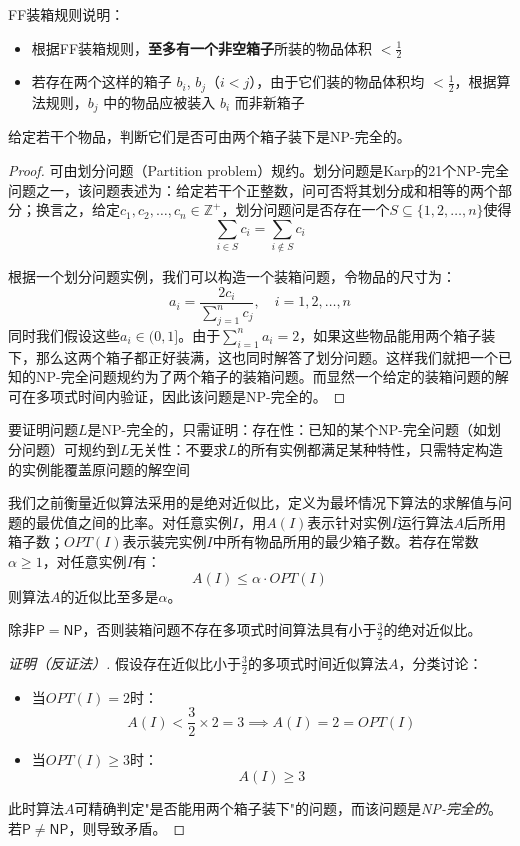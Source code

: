 \documentclass[./../main.tex]{subfiles} %
\begin{document}
FF装箱规则说明：
\begin{itemize}
    \item 根据FF装箱规则，\textbf{至多有一个非空箱子}所装的物品体积 $< \frac{1}{2}$
    \item 若存在两个这样的箱子 $b_i$, $b_j$（$i < j$），由于它们装的物品体积均 $< \frac{1}{2}$，根据算法规则，$b_j$ 中的物品应被装入 $b_i$ 而非新箱子
\end{itemize}

\begin{theorem}
    给定若干个物品，判断它们是否可由两个箱子装下是NP-完全的。
\end{theorem}

\begin{proof}
    可由划分问题（Partition problem）规约。划分问题是Karp的21个NP-完全问题之一，该问题表述为：给定若干个正整数，问可否将其划分成和相等的两个部分；换言之，给定$c_1, c_2, \ldots, c_n \in \mathbb{Z}^+$，划分问题问是否存在一个$S \subseteq \{1,2,\ldots,n\}$使得
    $$
    \sum_{i \in S} c_i = \sum_{i \notin S} c_i
    $$

    根据一个划分问题实例，我们可以构造一个装箱问题，令物品的尺寸为：
    $$
    a_i = \frac{2c_i}{\sum_{j=1}^{n} c_j}, \quad i=1,2,\ldots,n
    $$
    同时我们假设这些$a_i \in (0,1]$。由于$\sum_{i=1}^{n} a_i = 2$，如果这些物品能用两个箱子装下，那么这两个箱子都正好装满，这也同时解答了划分问题。这样我们就把一个已知的NP-完全问题规约为了两个箱子的装箱问题。而显然一个给定的装箱问题的解可在多项式时间内验证，因此该问题是NP-完全的。
\end{proof}


要证明问题$L$是NP-完全的，只需证明：
​存在性​：已知的某个NP-完全问题（如划分问题）可规约到$L$
​无关性​：不要求$L$的所有实例都满足某种特性，只需特定构造的实例能覆盖原问题的解空间

我们之前衡量近似算法采用的是绝对近似比，定义为最坏情况下算法的求解值与问题的最优值之间的比率。对任意实例$I$，用$A(I)$表示针对实例$I$运行算法$A$后所用箱子数；$OPT(I)$表示装完实例$I$中所有物品所用的最少箱子数。若存在常数$\alpha \geq 1$，对任意实例$I$有：
$$
A(I) \leq \alpha \cdot OPT(I)
$$
则算法$A$的近似比至多是$\alpha$。

\begin{theorem}
除非$\mathsf{P} = \mathsf{NP}$，否则装箱问题不存在多项式时间算法具有小于$\frac{3}{2}$的绝对近似比。
\end{theorem}

\begin{proof}[证明（反证法）]
假设存在近似比小于$\frac{3}{2}$的多项式时间近似算法$A$，分类讨论：
\begin{itemize}
    \item 当$OPT(I) = 2$时：
    $$
    A(I) < \frac{3}{2} \times 2 = 3 \implies A(I) = 2 = OPT(I)
    $$
    
    \item 当$OPT(I) \geq 3$时：
    $$
    A(I) \geq 3
    $$
\end{itemize}
此时算法$A$可精确判定"是否能用两个箱子装下"的问题，而该问题是\emph{NP-完全的}。若$\mathsf{P} \neq \mathsf{NP}$，则导致矛盾。
\end{proof}
\end{document}
